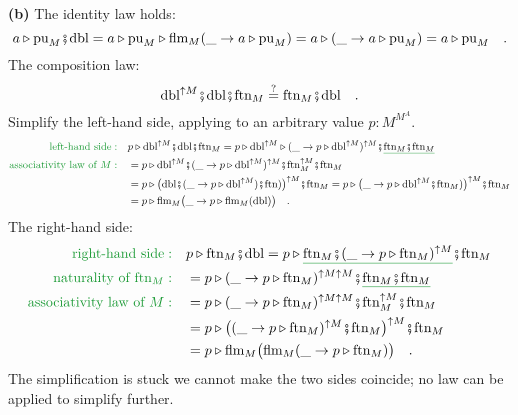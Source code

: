 \textbf{(b)} The identity law holds:
\[
a\triangleright\text{pu}_{M}\bef\text{dbl}=a\triangleright\text{pu}_{M}\triangleright\text{flm}_{M}(\_\rightarrow a\triangleright\text{pu}_{M})=a\triangleright(\_\rightarrow a\triangleright\text{pu}_{M})=a\triangleright\text{pu}_{M}\quad.
\]
The composition law:
\[
\text{dbl}^{\uparrow M}\bef\text{dbl}\bef\text{ftn}_{M}\overset{?}{=}\text{ftn}_{M}\bef\text{dbl}\quad.
\]
Simplify the left-hand side, applying to an arbitrary value $p:M^{M^{A}}$.
\begin{align*}
{\color{greenunder}\text{left-hand side}:}\quad & p\triangleright\text{dbl}^{\uparrow M}\bef\text{dbl}\bef\text{ftn}_{M}=p\triangleright\text{dbl}^{\uparrow M}\triangleright(\_\rightarrow p\triangleright\text{dbl}^{\uparrow M})^{\uparrow M}\bef\gunderline{\text{ftn}_{M}\bef\text{ftn}_{M}}\\
{\color{greenunder}\text{associativity law of }M:}\quad & =p\triangleright\text{dbl}^{\uparrow M}\bef(\_\rightarrow p\triangleright\text{dbl}^{\uparrow M})^{\uparrow M}\bef\text{ftn}_{M}^{\uparrow M}\bef\text{ftn}_{M}\\
 & =p\triangleright\big(\text{dbl}\bef(\_\rightarrow p\triangleright\text{dbl}^{\uparrow M})\bef\text{ftn})\big)^{\uparrow M}\bef\text{ftn}_{M}=p\triangleright\big(\_\rightarrow p\triangleright\text{dbl}^{\uparrow M}\bef\text{ftn}_{M})\big)^{\uparrow M}\bef\text{ftn}_{M}\\
 & =p\triangleright\text{flm}_{M}\big(\_\rightarrow p\triangleright\text{flm}_{M}(\text{dbl})\big)\quad.
\end{align*}
The right-hand side:
\begin{align*}
{\color{greenunder}\text{right-hand side}:}\quad & p\triangleright\text{ftn}_{M}\bef\text{dbl}=p\triangleright\gunderline{\text{ftn}_{M}\bef(\_\rightarrow p\triangleright\text{ftn}_{M})^{\uparrow M}}\bef\text{ftn}_{M}\\
{\color{greenunder}\text{naturality of }\text{ftn}_{M}:}\quad & =p\triangleright(\_\rightarrow p\triangleright\text{ftn}_{M})^{\uparrow M\uparrow M}\bef\gunderline{\text{ftn}_{M}\bef\text{ftn}_{M}}\\
{\color{greenunder}\text{associativity law of }M:}\quad & =p\triangleright(\_\rightarrow p\triangleright\text{ftn}_{M})^{\uparrow M\uparrow M}\bef\text{ftn}_{M}^{\uparrow M}\bef\text{ftn}_{M}\\
 & =p\triangleright\big((\_\rightarrow p\triangleright\text{ftn}_{M})^{\uparrow M}\bef\text{ftn}_{M}\big)^{\uparrow M}\bef\text{ftn}_{M}\\
 & =p\triangleright\text{flm}_{M}\big(\text{flm}_{M}(\_\rightarrow p\triangleright\text{ftn}_{M})\big)\quad.
\end{align*}
The simplification is stuck \textemdash{} we cannot make the two sides
coincide; no law can be applied to simplify further.

